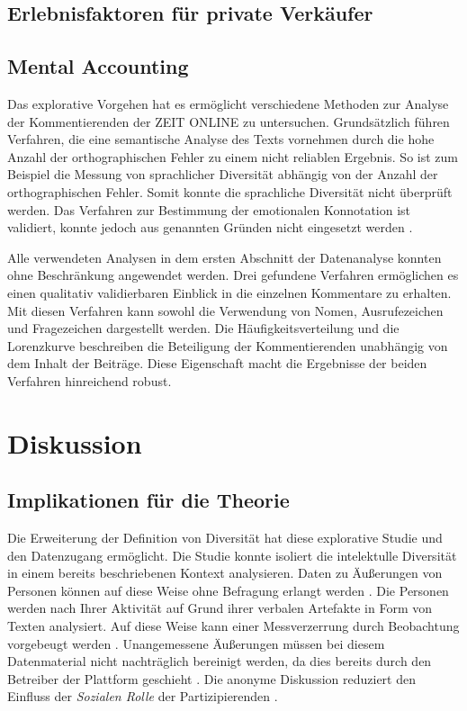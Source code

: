 \documentclass[12pt,a4paper,oneside]{article}
\begin{document}
\begin{titlepage}
\begin{flushleft}
\subsection{Erlebnisfaktoren für private Verkäufer}
\subsection{Mental Accounting}
Das explorative Vorgehen hat es ermöglicht verschiedene Methoden zur Analyse der Kommentierenden der ZEIT ONLINE zu untersuchen. Grundsätzlich führen Verfahren, die eine semantische Analyse des Texts vornehmen durch die hohe Anzahl der orthographischen Fehler zu einem nicht reliablen Ergebnis. So ist zum Beispiel die Messung von sprachlicher Diversität abhängig von der Anzahl der orthographischen Fehler. Somit konnte die sprachliche Diversität nicht überprüft werden. Das Verfahren zur Bestimmung der emotionalen Konnotation ist validiert, konnte jedoch aus genannten Gründen nicht eingesetzt werden \cite{vo2006cross,vo2009berlin}.

Alle verwendeten Analysen in dem ersten Abschnitt der Datenanalyse konnten ohne Beschränkung angewendet werden. Drei gefundene Verfahren ermöglichen es einen qualitativ validierbaren Einblick in die einzelnen Kommentare zu erhalten. Mit diesen Verfahren kann sowohl die Verwendung von Nomen, Ausrufezeichen und Fragezeichen dargestellt werden. Die Häufigkeits\-verteilung und die Lorenzkurve beschreiben die Beteiligung der Kommentierenden unabhängig von dem Inhalt der Beiträge. Diese Eigenschaft macht die Ergebnisse der beiden Verfahren hinreichend robust.

\newpage
\section{Diskussion}
\subsection{Implikationen für die Theorie}
Die Erweiterung der Definition von Diversität hat diese explorative Studie und den Datenzugang ermöglicht. Die Studie konnte isoliert die intelektulle Diversität in einem bereits beschriebenen Kontext analysieren. Daten zu Äußerungen von Personen können auf diese Weise ohne Befragung erlangt werden \cite{joshi2009role,jackson2003recent}. Die Personen werden nach Ihrer Aktivität auf Grund ihrer verbalen Artefakte in Form von Texten analysiert. Auf diese Weise kann einer Messverzerrung durch Beobachtung vorgebeugt werden \cite{ruso2007qualitative}. Unangemessene Äußerungen müssen bei diesem Datenmaterial nicht nachträglich bereinigt werden, da dies bereits durch den Betreiber der Plattform geschieht \cite{kiesler1984social,siegel1986group}. Die anonyme Diskussion reduziert den Einfluss der \textit{Sozialen Rolle} der Partizipierenden \cite{dey2001understanding}.


\end{flushleft}
\end{titlepage}
\end{document}
